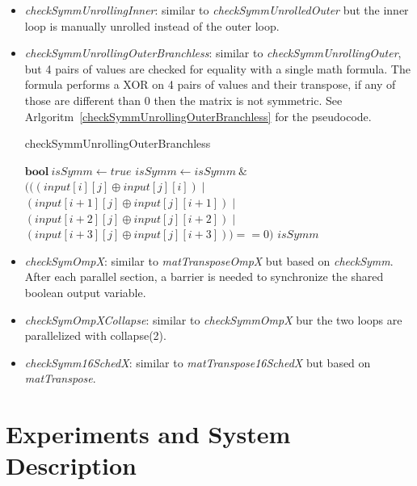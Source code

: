 \documentclass[conference]{IEEEtran}
\begin{document}
\begin{itemize}
\item \textit{checkSymmUnrollingInner}: similar to \textit{checkSymmUnrolledOuter} but the inner loop is manually unrolled instead of the outer loop.
\item \textit{checkSymmUnrollingOuterBranchless}: similar to \textit{checkSymmUnrollingOuter}, but 4 pairs of values are checked for equality with a single math formula. The formula performs a XOR on 4 pairs of values and their transpose, if any of those are different than 0 then the matrix is not symmetric. See Arlgoritm~\ref{checkSymmUnrollingOuterBranchless} for the pseudocode.


\begin{algorithm}
	\caption{checkSymmUnrollingOuterBranchless}\label{checkSymmUnrollingOuterBranchless}
	\begin{algorithmic}[1]
		\State $\textbf{bool}\ isSymm \gets true$
		\State $isSymm \gets isSymm\ \& $
		\State $(((input[i][j] \oplus input[j][i]) \mid $
		\State $(input[i+1][j] \oplus input[j][i+1]) \mid $
		\State $(input[i+2][j] \oplus input[j][i+2]) \mid $
		\State $(input[i+3][j] \oplus input[j][i+3])) == 0)$
		\EndFor
		\EndFor
		\State \Return $isSymm$
	\end{algorithmic}
\end{algorithm}

\item \textit{checkSymOmpX}: similar to \textit{matTransposeOmpX} but based on \textit{checkSymm}. After each parallel section, a barrier is needed to synchronize the shared boolean output variable.
\item \textit{checkSymOmpXCollapse}: similar to \textit{checkSymmOmpX} bur the two loops are parallelized with collapse(2).
\item \textit{checkSymm16SchedX}: similar to \textit{matTranspose16SchedX} but based on \textit{matTranspose}.
\end{itemize}

\section{Experiments and System Description}

\end{document}
